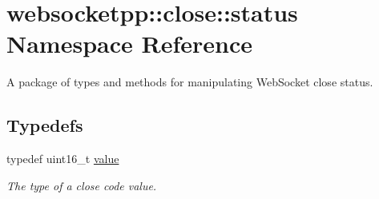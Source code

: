 \hypertarget{namespacewebsocketpp_1_1close_1_1status}{}\section{websocketpp\+:\+:close\+:\+:status Namespace Reference}
\label{namespacewebsocketpp_1_1close_1_1status}


A package of types and methods for manipulating Web\+Socket close status\textquotesingle{}.  


\subsection*{Typedefs}
\begin{DoxyCompactItemize}
\item 
typedef uint16\+\_\+t \hyperlink{namespacewebsocketpp_1_1close_1_1status_a8614a5c4733d708e2d2a32191c5bef84}{value}\hypertarget{namespacewebsocketpp_1_1close_1_1status_a8614a5c4733d708e2d2a32191c5bef84}{}\label{namespacewebsocketpp_1_1close_1_1status_a8614a5c4733d708e2d2a32191c5bef84}

\begin{DoxyCompactList}\small\item\em The type of a close code value. \end{DoxyCompactList}\end{DoxyCompactItemize}
